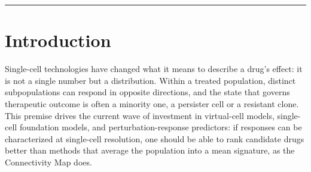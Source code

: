 \documentclass[11pt,letterpaper]{article}
\begin{document}
\begin{abstract}
\noindent
Single-cell drug retrieval is moving from mean signatures to distributional scores over treated populations, and routinely reports large gains under a metric of its own kind. We audit that practice under increasingly independent criteria, and show that mean-signature retrieval is the distributional family's zero-variance limit, not a competitor. Holding rankings, scorer and queries fixed and changing only the judge, distributional retrieval is decisively ahead under objective-aligned metrics, reverses under mechanism recovery, and beats its incumbent against an external functional oracle, where a scalar comparing no distributions reproduces most of it. Even blind external oracles reverse the winner by statistical form. We formalise when cell-level structure can pay off as two gates, differential response and recoverability; in patient tumours nobody constructed both open, yet no advantage appears: the mean already ranks most of what a subpopulation does. Distributional information here is real, and much smaller than objective-aligned evaluation makes it appear.
\end{abstract}

\bigskip\noindent\rule{\textwidth}{0.4pt}\bigskip

\section*{Introduction}

Single-cell technologies have changed what it means to describe a drug's effect: it is not a single number but a distribution. Within a treated population, distinct subpopulations can respond in opposite directions, and the state that governs therapeutic outcome is often a minority one, a persister cell or a resistant clone. This premise drives the current wave of investment in virtual-cell models\cite{AIVirtualCell}, single-cell foundation models\cite{ref7,ref8,ref9}, and perturbation-response predictors\cite{ref4,ref5,ref10}: if responses can be characterized at single-cell resolution, one should be able to rank candidate drugs better than methods that average the population into a mean signature, as the Connectivity Map does\cite{ref1,ref2}.
\end{document}
